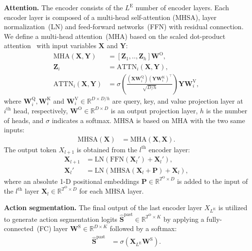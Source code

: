 \noindent
\textbf{Attention.}
The encoder consists of the $L^\mathrm{E}$ number of encoder layers.
Each encoder layer is composed of a multi-head self-attention (MHSA), layer normalization~(LN) and feed-forward networks~(FFN) with residual connection.
We define a multi-head attention~(MHA) based on the scaled dot-product attention~\cite{vaswani2017attention} with input variables $\bm{X}$ and $\bm{Y}$: 
\begin{align}
    \mathrm{MHA}(\bm{X},\bm{Y})&=[\bm{Z}_1,..,\bm{Z}_h]\bm{W}^\mathrm{O},
    \label{eq:2}
    \\
    \bm{Z}_i&=\mathrm{ATTN}_i(\bm{X},\bm{Y}),
    \label{eq:3}
    \\
    \mathrm{ATTN}_i(\bm{X},\bm{Y})&=\sigma(\frac{(\bm{X}\bm{W}^\mathrm{Q}_i)(\bm{Y}\bm{W}^\mathrm{K}_i)^\top}{\sqrt{D/h}})\bm{Y}\bm{W}^\mathrm{V}_i,
    \label{eq:4}
\end{align}
where $\bm{W}^\mathrm{Q}_i, \bm{W}^\mathrm{K}_i$ and $\bm{W}^\mathrm{V}_i  \in \mathbb{R}^{D \times D/h}$ are query, key, and value projection layer at $i^{\textrm{th}}$ head, respectively, $\bm{W}^\mathrm{O} \in \mathbb{R}^{D \times D}$ is an output projection layer, $h$ is the number of heads, and $\sigma$ indicates a softmax.
MHSA is based on MHA with the two same inputs:
\begin{align}
    \mathrm{MHSA}(\bm{X})&=\mathrm{MHA}(\bm{X},\bm{X}).
    \label{eq:5}
\end{align}
The output token $X_{l+1}$ is obtained from the $l^{\textrm{th}}$ encoder layer:
\begin{align}
    \bm{X}_{l+1} &= \mathrm{LN}(\mathrm{FFN}(\bm{X}_l') + \bm{X}_l'),
    \\
    \bm{X}_l' &= \mathrm{LN}(\mathrm{MHSA}(\bm{X}_l+\bm{P}) + \bm{X}_l),
\end{align}
where an absolute 1-D positional embeddings $\bm{P} \in \mathbb{R}^{T^\mathrm{O} \times D}$ is added to the input of the $l^\mathrm{th}$ layer $\bm{X}_l\in \mathbb{R}^{T^\mathrm{O} \times D}$ for each MHSA layer.


\noindent
\textbf{Action segmentation.}
The final output of the last encoder layer $X_{L^{\mathrm{E}}}$ is utilized to generate action segmentation logits $\hat{\bm{S}}^{\mathrm{past}} \in \mathbb{R}^{T^{\mathrm{O}} \times K}$
by applying a fully-connected~(FC) layer $\bm{W}^{\mathrm{S}}\in\mathbb{R}^{D \times K}$ followed by a softmax:
\begin{align}
    \hat{\bm{S}}^\mathrm{past}&= \sigma(\bm{X}_{L^{\mathrm{E}}}\bm{W}^{\mathrm{S}}).
\end{align}


